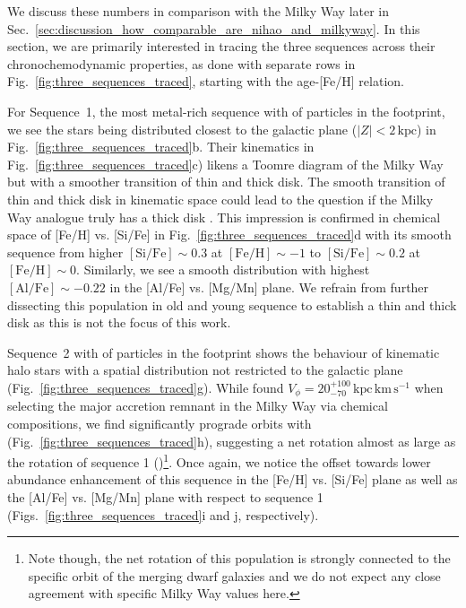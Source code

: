 \documentclass[fleqn,usenatbib]{mnras}
\begin{document}
We discuss these numbers in comparison with the Milky Way later in Sec.~\ref{sec:discussion_how_comparable_are_nihao_and_milkyway}. In this section, we are primarily interested in tracing the three sequences across their chronochemodynamic properties, as done with separate rows in Fig.~\ref{fig:three_sequences_traced}, starting with the age-[Fe/H] relation.

For Sequence~1, the most metal-rich sequence with  of particles in the footprint, we see the stars being distributed closest to the galactic plane ($\vert Z \vert < 2\,\mathrm{kpc}$) in Fig.~\ref{fig:three_sequences_traced}b. Their kinematics in Fig.~\ref{fig:three_sequences_traced}c) likens a Toomre diagram of the Milky Way  \citep[][see their Fig.~1a]{Helmi2018} but with a smoother transition of thin and thick disk. The smooth transition of thin and thick disk in kinematic space could lead to the question if the Milky Way analogue truly has a thick disk \citep[see][who raised the same question for the actual Milky Way]{Bovy2012b}. This impression is confirmed in chemical space of [Fe/H] vs. [Si/Fe] in Fig.~\ref{fig:three_sequences_traced}d with its smooth sequence from higher $\mathrm{[Si/Fe]} \sim 0.3$ at $\mathrm{[Fe/H] \sim -1}$ to $\mathrm{[Si/Fe]} \sim 0.2$ at $\mathrm{[Fe/H] \sim 0}$. Similarly, we see a smooth distribution with highest $\mathrm{[Al/Fe]} \sim -0.22$ in the [Al/Fe] vs. [Mg/Mn] plane. We refrain from further dissecting this population in old and young sequence to establish a thin and thick disk as this is not the focus of this work.

Sequence~2 with  of particles in the footprint shows the behaviour of kinematic halo stars with a spatial distribution not restricted to the galactic plane (Fig.~\ref{fig:three_sequences_traced}g). While \citet{Buder2022} found $V_\phi = {20}_{-70}^{+100}\,\mathrm{kpc\,km\,s^{-1}}$ when selecting the major accretion remnant in the Milky Way via chemical compositions, we find significantly prograde orbits with  (Fig.~\ref{fig:three_sequences_traced}h), suggesting a net rotation almost as large as the rotation of sequence 1 ()\footnote{Note though, the net rotation of this population is strongly connected to the specific orbit of the merging dwarf galaxies and we do not expect any close agreement with specific Milky Way values here.}. Once again, we notice the offset towards lower abundance enhancement of this sequence in the [Fe/H] vs. [Si/Fe] plane as well as the [Al/Fe] vs. [Mg/Mn] plane with respect to sequence 1 (Figs.~\ref{fig:three_sequences_traced}i and j, respectively).
\end{document}
